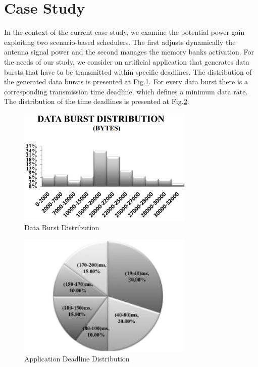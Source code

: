 \section{Case Study}

In the context of the current case study, we examine the potential power gain exploiting two scenario-based schedulers. The first adjusts dynamically the antenna signal power and the second manages the memory banks activation. For the needs of our study, we consider an artificial application that generates data bursts that have to be transmitted within specific deadlines. The distribution of the generated data bursts is presented at Fig.\ref{fig:F5}. For every data burst there is a corresponding transmission time deadline, which defines a minimum data rate. The distribution of the time deadlines is presented at Fig.\ref{fig:F6}.
 
\begin{figure}
\centering
\includegraphics[width=0.75\textwidth]{F/image9.png}
\caption{Data Burst Distribution}
\label{fig:F5}
\end{figure}	

\begin{figure}
\centering
\includegraphics[width=0.75\textwidth]{F/image10.png}
\caption{Application Deadline Distribution}
\label{fig:F6}
\end{figure}	

